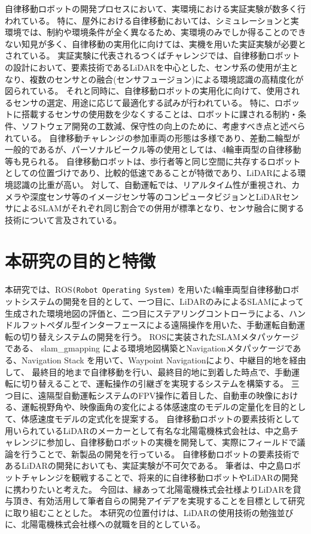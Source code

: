 自律移動ロボットの開発プロセスにおいて、実環境における実証実験が数多く行われている。
特に、屋外における自律移動においては、シミュレーションと実環境では、制約や環境条件が全く異なるため、実環境のみでしか得ることのできない知見が多く、自律移動の実用化に向けては、実機を用いた実証実験が必要とされている。
実証実験に代表されるつくばチャレンジでは、自律移動ロボットの設計において、要素技術であるLiDARを中心とした、センサ系の使用が主となり、複数のセンサとの融合(センサフュージョン)による環境認識の高精度化が図られている。
それと同時に、自律移動ロボットの実用化に向けて、使用されるセンサの選定、用途に応じて最適化する試みが行われている。
特に、ロボットに搭載するセンサの使用数を少なくすることは、ロボットに課される制約・条件、ソフトウェア開発の工数減、保守性の向上のために、考慮すべき点と述べられている。
自律移動チャレンジの参加車両の形態は多様であり、差動二輪型が一般的であるが、パーソナルビークル等の使用としては、4輪車両型の自律移動等も見られる。
自律移動ロボットは、歩行者等と同じ空間に共存するロボットとしての位置づけであり、比較的低速であることが特徴であり、LiDARによる環境認識の比重が高い。
対して、自動運転では、リアルタイム性が重視され、カメラや深度センサ等のイメージセンサ等のコンピュータビジョンとLiDARセンサによるSLAMがそれぞれ同じ割合での併用が標準となり、センサ融合に関する技術について言及されている。

\section{本研究の目的と特徴}
本研究では、ROS\verb|(Robot Operating System)|
を用いた4輪車両型自律移動ロボットシステムの開発を目的として、一つ目に、LiDARのみによるSLAMによって生成された環境地図の評価と、二つ目にステアリングコントローラによる、ハンドルフットペダル型インターフェースによる遠隔操作を用いた、手動運転自動運転の切り替えシステムの開発を行う。
ROSに実装されたSLAMメタパッケージである、
slam\_gmapping
による環境地図構築とNavigationメタパッケージである、Navigation Stack を用いて、Waypoint Navigationにより、中継目的地を経由して、
最終目的地まで自律移動を行い、最終目的地に到着した時点で、手動運転に切り替えることで、運転操作の引継ぎを実現するシステムを構築する。
三つ目に、遠隔型自動運転システムのFPV操作に着目した、自動車の映像における、運転視野角や、映像画角の変化による体感速度のモデルの定量化を目的として、体感速度モデルの定式化を提案する。
自律移動ロボットの要素技術として用いられているLiDARのメーカーとして有名な北陽電機株式会社は、中之島チャレンジに参加し、自律移動ロボットの実機を開発して、実際にフィールドで議論を行うことで、新製品の開発を行っている。
自律移動ロボットの要素技術であるLiDARの開発においても、実証実験が不可欠である。
筆者は、中之島ロボットチャレンジを観戦することで、将来的に自律移動ロボットやLiDARの開発に携わりたいと考えた。
今回は、縁あって北陽電機株式会社様よりLiDARを貸与頂き、有効活用して筆者自らの開発アイデアを実現することを目標として研究に取り組むこととした。
本研究の位置付けは、LiDARの使用技術の勉強並びに、北陽電機株式会社様への就職を目的としている。

